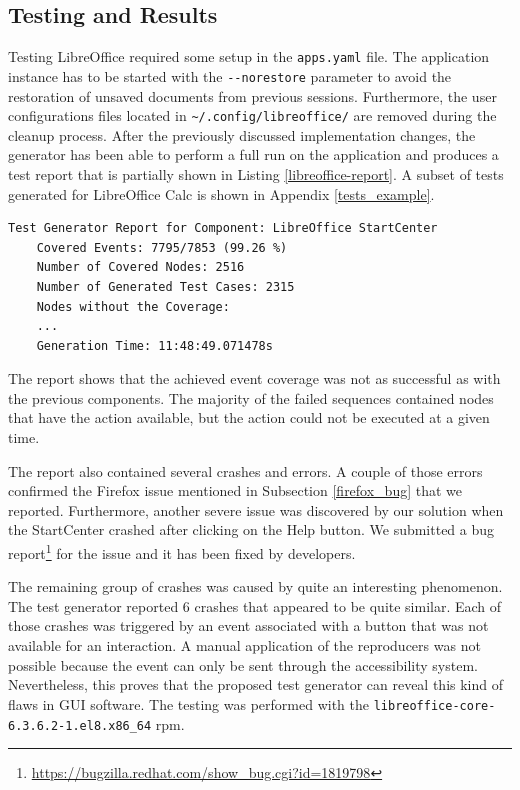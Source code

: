 \subsection*{Testing and Results}\label{libreoffice-test}
Testing LibreOffice required some setup in the \texttt{apps.yaml} file. The application instance has to be started with the \texttt{-{}-norestore} parameter to avoid the restoration of unsaved documents from previous sessions. Furthermore, the user configurations files located in \texttt{\textasciitilde/.config/libreoffice/} are removed during the cleanup process. After the previously discussed implementation changes, the generator has been able to perform a full run on the application and produces a test report that is partially shown in Listing \ref{libreoffice-report}. A subset of tests generated for LibreOffice Calc is shown in Appendix \ref{tests_example}.

\begin{lstlisting}[caption={The final test generator report for LibreOffice StartCenter},label={libreoffice-report}, float]
    Test Generator Report for Component: LibreOffice StartCenter
    Covered Events: 7795/7853 (99.26 %) 
    Number of Covered Nodes: 2516
    Number of Generated Test Cases: 2315
    Nodes without the Coverage:
    ...
    Generation Time: 11:48:49.071478s
\end{lstlisting}

The report shows that the achieved event coverage was not as successful as with the previous components. The majority of the failed sequences contained nodes that have the action available, but the action could not be executed at a given time. 

The report also contained several crashes and errors. A couple of those errors confirmed the Firefox issue mentioned in Subsection \ref{firefox_bug} that we reported. Furthermore, another severe issue was discovered by our solution when the StartCenter crashed after clicking on the Help button. We submitted a bug report\footnote{\url{https://bugzilla.redhat.com/show_bug.cgi?id=1819798}} for the issue and it has been fixed by developers. 

The remaining group of crashes was caused by quite an interesting phenomenon. The test generator reported 6 crashes that appeared to be quite similar. Each of those crashes was triggered by an event associated with a button that was not available for an interaction. A manual application of the reproducers was not possible because the event can only be sent through the accessibility system. Nevertheless, this proves that the proposed test generator can reveal this kind of flaws in GUI software. The testing was performed with the \texttt{libreoffice-core-6.3.6.2-1.el8.x86\_64} rpm.

